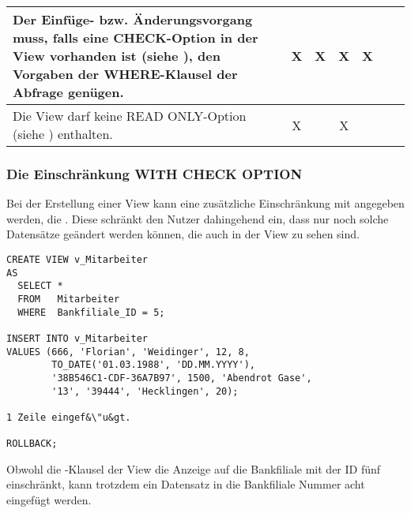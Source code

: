 \begin{center}
\begin{small}
\begin{supertabular}{|p{8.5cm}|c|c|c|c|c|c|}
              \hline
              Der Einf\"uge- bzw. \"Anderungsvorgang muss, falls eine CHECK-Option in der View vorhanden ist (siehe ), den Vorgaben der WHERE-Klausel der Abfrage gen\"ugen. & X & X & X & X & & \\
              \hline
              Die View darf keine READ ONLY-Option (siehe ) enthalten. & X & & X & & &\\
            \end{supertabular}
          \end{small}
        \end{center}
        \subsubsection{Die Einschr\"ankung WITH CHECK OPTION}
          \label{CHECK}
          Bei der Erstellung einer View kann eine zus\"atzliche Einschr\"ankung mit angegeben werden, die . Diese schr\"ankt den Nutzer dahingehend ein, dass nur noch solche Datens\"atze ge\"andert werden k\"onnen, die auch in der View zu sehen sind.
          \begin{lstlisting}[language=oracle_sql,caption={Ein Experiment mit den CHECK OPTION},label=sql08_35]
CREATE VIEW v_Mitarbeiter
AS
  SELECT *
  FROM   Mitarbeiter
  WHERE  Bankfiliale_ID = 5;

INSERT INTO v_Mitarbeiter
VALUES (666, 'Florian', 'Weidinger', 12, 8,
        TO_DATE('01.03.1988', 'DD.MM.YYYY'),
        '38B546C1-CDF-36A7B97', 1500, 'Abendrot Gase',
        '13', '39444', 'Hecklingen', 20);

1 Zeile eingef&\"u&gt.

ROLLBACK;
          \end{lstlisting}
          Obwohl die \WHERE-Klausel der View  die Anzeige auf die Bankfiliale mit der ID f\"unf einschr\"ankt, kann trotzdem ein Datensatz in die Bankfiliale Nummer acht eingef\"ugt werden.


